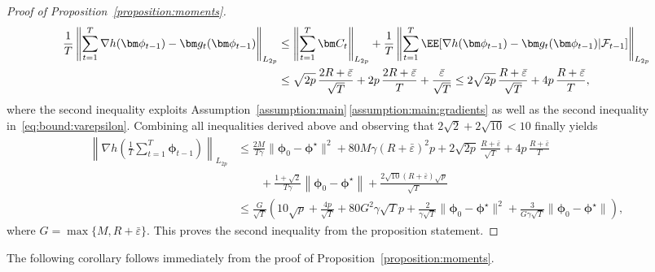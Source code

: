 \documentclass[11pt, a4paper, oneside, reqno]{article}
\begin{document}
\begin{proof}[Proof of Proposition~\ref{proposition:moments}]
\begin{align*}
		\frac{1}{T} \left\| \sum_{t=1}^T \nabla h(\bm \phi_{t-1}) - \bm g_t(\bm \phi_{t-1}) \right\|_{L_{2p}} 
		&\leq \left\| \sum_{t=1}^T \bm C_t \right\|_{L_{2p}} + \frac{1}{T} \left\| \sum_{t=1}^T \EE[\nabla h(\bm \phi_{t-1}) - \bm g_t(\bm \phi_{t-1}) | \mathcal F_{t-1}] \right\|_{L_{2p}} \\
		&\leq \sqrt{2p} \, \frac{2R + \bar \varepsilon}{\sqrt{T}} + 2p \, \frac{2R + \bar \varepsilon}{T} + \frac{\bar \varepsilon}{\sqrt{T}}
		\leq 2 \sqrt{2p} \, \frac{R + \bar \varepsilon}{\sqrt{T}} + 4p \, \frac{R + \bar \varepsilon}{T},
		\end{align*}
		where the second inequality exploits Assumption~\ref{assumption:main}\,\ref{assumption:main:gradients} as well as the second inequality in~\eqref{eq:bound:varepsilon}.
		Combining all inequalities derived above and observing that $2\sqrt{2} + 2 \sqrt{10} < 10 $ finally yields
		\begin{align*}
		\left\| \nabla h \left(\frac{1}{T} \sum_{t=1}^{T} \bm \phi_{t-1} \right) \right\|_{L_{2p}}
		&\leq \frac{2 M}{T \gamma} \| \bm \phi_0 - \bm \phi^\star \|^2 + 80 M \gamma \left( R + \bar \varepsilon \right)^2 p +  2 \sqrt{2p} \, \frac{R + \bar \varepsilon}{\sqrt{T}} + 4p \, \frac{R + \bar \varepsilon}{T} \\
		&\qquad + \frac{1 + \sqrt{2}}{T \gamma} \left\| \bm \phi_0 - \bm \phi^\star \right\| + \frac{2 \sqrt{10} \left( R + \bar \varepsilon \right) \sqrt{p}}{\sqrt{T}} \\
		&\leq \frac{G}{\sqrt{T}} \left( 10 \sqrt{p} + \frac{4p}{\sqrt{T}} + 80 G^2 \gamma \sqrt{T} p + \frac{2}{\gamma \sqrt{T}} \| \bm \phi_0 - \bm \phi^\star \|^2 + \frac{3}{G \gamma \sqrt{T}} \| \bm \phi_0 - \bm \phi^\star \| \right), 
		\end{align*}
		where $G = \max\{ M, R + \bar \varepsilon \}$. This proves the second inequality from the proposition statement.
	\end{proof}
	
	The following corollary follows immediately from the proof of Proposition~\ref{proposition:moments}.
	
\end{document}
